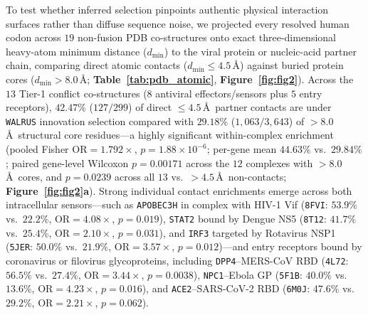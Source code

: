 \documentclass[11pt,letterpaper]{article}
\newcommand{\WALRUS}{\texttt{WALRUS}\xspace}
\begin{document}
To test whether inferred selection pinpoints authentic physical interaction surfaces rather than diffuse sequence noise, we projected every resolved human codon across $19$ non-fusion PDB co-structures onto exact three-dimensional heavy-atom minimum distance ($d_{\min}$) to the viral protein or nucleic-acid partner chain, comparing direct atomic contacts ($d_{\min} \le 4.5$\,\AA) against buried protein cores ($d_{\min} > 8.0$\,\AA; \textbf{Table~\ref{tab:pdb_atomic}}, \textbf{Figure~\ref{fig:fig2}}). Across the $13$ Tier-1 conflict co-structures ($8$ antiviral effectors/sensors plus $5$ entry receptors), $42.47\%$ ($127/299$) of direct $\le 4.5$\,\AA\ partner contacts are under \WALRUS innovation selection compared with $29.18\%$ ($1,063/3,643$) of $>8.0$\,\AA\ structural core residues---a highly significant within-complex enrichment (pooled Fisher $\mathrm{OR} = 1.792\times$, $p = 1.88 \times 10^{-6}$; per-gene mean $44.63\%$ vs.\ $29.84\%$; paired gene-level Wilcoxon $p = 0.00171$ across the $12$ complexes with $>8.0$\,\AA\ cores, and $p = 0.0239$ across all $13$ vs.\ $>4.5$\,\AA\ non-contacts; \textbf{Figure~\ref{fig:fig2}a}). Strong individual contact enrichments emerge across both intracellular sensors---such as \texttt{APOBEC3H} in complex with HIV-1 Vif (\texttt{8FVI}: $53.9\%$ vs.\ $22.2\%$, $\mathrm{OR} = 4.08\times$, $p = 0.019$), \texttt{STAT2} bound by Dengue NS5 (\texttt{8T12}: $41.7\%$ vs.\ $25.4\%$, $\mathrm{OR} = 2.10\times$, $p = 0.031$), and \texttt{IRF3} targeted by Rotavirus NSP1 (\texttt{5JER}: $50.0\%$ vs.\ $21.9\%$, $\mathrm{OR} = 3.57\times$, $p = 0.012$)---and entry receptors bound by coronavirus or filovirus glycoproteins, including \texttt{DPP4}--MERS-CoV RBD (\texttt{4L72}: $56.5\%$ vs.\ $27.4\%$, $\mathrm{OR} = 3.44\times$, $p = 0.0038$), \texttt{NPC1}--Ebola GP (\texttt{5F1B}: $40.0\%$ vs.\ $13.6\%$, $\mathrm{OR} = 4.23\times$, $p = 0.016$), and \texttt{ACE2}--SARS-CoV-2 RBD (\texttt{6M0J}: $47.6\%$ vs.\ $29.2\%$, $\mathrm{OR} = 2.21\times$, $p = 0.062$).
\end{document}
